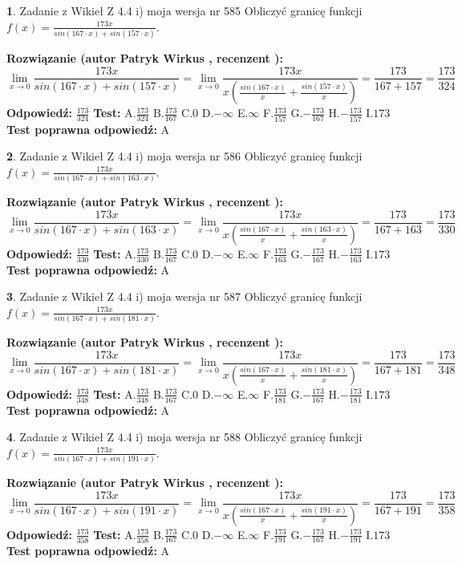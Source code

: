 \documentclass[12pt, a4paper]{article}
\theoremstyle{definition} %
\newtheorem{zad}{}
\newcommand{\zadStart}[1]{\begin{zad}#1\newline}
\newcommand{\zadStop}{\end{zad}}
\newcommand{\rozwStart}[2]{\noindent \textbf{Rozwiązanie (autor #1 , recenzent #2): }\newline}
\newcommand{\rozwStop}{\newline}
\newcommand{\odpStart}{\noindent \textbf{Odpowiedź:}\newline}
\newcommand{\odpStop}{\newline}
\newcommand{\testStart}{\noindent \textbf{Test:}\newline}
\newcommand{\testStop}{\newline}
\newcommand{\kluczStart}{\noindent \textbf{Test poprawna odpowiedź:}\newline}
\newcommand{\kluczStop}{\newline}
\begin{document}
\zadStart{Zadanie z Wikieł Z 4.4 i) moja wersja nr 585}
Obliczyć granicę funkcji $f(x)=\frac{173x}{sin(167\cdot x) +sin(157\cdot x)}$.
\zadStop
\rozwStart{Patryk Wirkus}{}
$$\lim\limits_{x\to 0}\frac{173x}{sin(167\cdot x) +sin(157\cdot x)}=\lim\limits_{x\to 0}\frac{173x}{x(\frac{sin(167\cdot x)}{x}+\frac{sin(157\cdot x)}{x})}=\frac{173}{167+157} = \frac{173}{324}$$
\rozwStop
\odpStart
$\frac{173}{324}$
\odpStop
\testStart
A.$\frac{173}{324}$
B.$\frac{173}{167}$
C.$0$
D.$-\infty$
E.$\infty$
F.$\frac{173}{157}$
G.$-\frac{173}{167}$
H.$-\frac{173}{157}$
I.$173$
\testStop
\kluczStart
A
\kluczStop



\zadStart{Zadanie z Wikieł Z 4.4 i) moja wersja nr 586}
Obliczyć granicę funkcji $f(x)=\frac{173x}{sin(167\cdot x) +sin(163\cdot x)}$.
\zadStop
\rozwStart{Patryk Wirkus}{}
$$\lim\limits_{x\to 0}\frac{173x}{sin(167\cdot x) +sin(163\cdot x)}=\lim\limits_{x\to 0}\frac{173x}{x(\frac{sin(167\cdot x)}{x}+\frac{sin(163\cdot x)}{x})}=\frac{173}{167+163} = \frac{173}{330}$$
\rozwStop
\odpStart
$\frac{173}{330}$
\odpStop
\testStart
A.$\frac{173}{330}$
B.$\frac{173}{167}$
C.$0$
D.$-\infty$
E.$\infty$
F.$\frac{173}{163}$
G.$-\frac{173}{167}$
H.$-\frac{173}{163}$
I.$173$
\testStop
\kluczStart
A
\kluczStop



\zadStart{Zadanie z Wikieł Z 4.4 i) moja wersja nr 587}
Obliczyć granicę funkcji $f(x)=\frac{173x}{sin(167\cdot x) +sin(181\cdot x)}$.
\zadStop
\rozwStart{Patryk Wirkus}{}
$$\lim\limits_{x\to 0}\frac{173x}{sin(167\cdot x) +sin(181\cdot x)}=\lim\limits_{x\to 0}\frac{173x}{x(\frac{sin(167\cdot x)}{x}+\frac{sin(181\cdot x)}{x})}=\frac{173}{167+181} = \frac{173}{348}$$
\rozwStop
\odpStart
$\frac{173}{348}$
\odpStop
\testStart
A.$\frac{173}{348}$
B.$\frac{173}{167}$
C.$0$
D.$-\infty$
E.$\infty$
F.$\frac{173}{181}$
G.$-\frac{173}{167}$
H.$-\frac{173}{181}$
I.$173$
\testStop
\kluczStart
A
\kluczStop



\zadStart{Zadanie z Wikieł Z 4.4 i) moja wersja nr 588}
Obliczyć granicę funkcji $f(x)=\frac{173x}{sin(167\cdot x) +sin(191\cdot x)}$.
\zadStop
\rozwStart{Patryk Wirkus}{}
$$\lim\limits_{x\to 0}\frac{173x}{sin(167\cdot x) +sin(191\cdot x)}=\lim\limits_{x\to 0}\frac{173x}{x(\frac{sin(167\cdot x)}{x}+\frac{sin(191\cdot x)}{x})}=\frac{173}{167+191} = \frac{173}{358}$$
\rozwStop
\odpStart
$\frac{173}{358}$
\odpStop
\testStart
A.$\frac{173}{358}$
B.$\frac{173}{167}$
C.$0$
D.$-\infty$
E.$\infty$
F.$\frac{173}{191}$
G.$-\frac{173}{167}$
H.$-\frac{173}{191}$
I.$173$
\testStop
\kluczStart
A
\kluczStop
\end{document}
